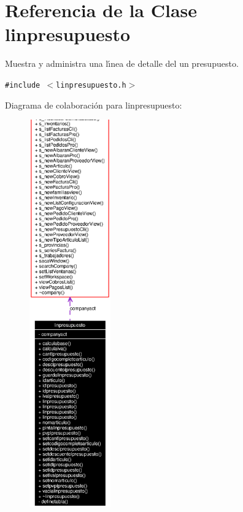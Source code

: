 \section{Referencia de la Clase linpresupuesto}
\label{classlinpresupuesto}
Muestra y administra una l\'{\i}nea de detalle del un presupuesto.  


{\tt \#include $<$linpresupuesto.h$>$}

Diagrama de colaboraci\'{o}n para linpresupuesto:\begin{figure}[H]
\begin{center}
\leavevmode
\includegraphics[width=99pt]{classlinpresupuesto__coll__graph}
\end{center}
\end{figure}
